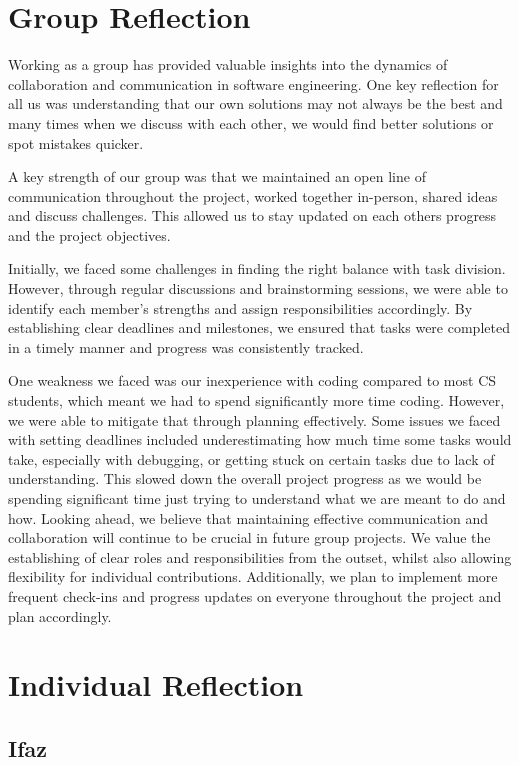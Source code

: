 \documentclass[12pt]{article}
\begin{document}
\section{Group Reflection}

Working as a group has provided valuable insights into the dynamics of collaboration and communication in software engineering. One key reflection for all us was understanding that our own solutions may not always be the best and many times when we discuss with each other, we would find better solutions or spot mistakes quicker.

A key strength of our group was that we maintained an open line of communication throughout the project, worked together in-person, shared ideas and  discuss challenges. This allowed us to stay updated on each others progress and the project objectives.

Initially, we faced some challenges in finding the right balance with task division. However, through regular discussions and brainstorming sessions, we were able to identify each member's strengths and assign responsibilities accordingly. By establishing clear deadlines and milestones, we ensured that tasks were completed in a timely manner and progress was consistently tracked.

One weakness we faced was our inexperience with coding compared to most CS students, which meant we had to spend significantly more time coding. However, we were able to mitigate that through planning effectively. Some issues we  faced with setting deadlines included underestimating how much time some tasks would take, especially with debugging, or getting stuck on certain tasks due to lack of understanding. This slowed down the overall project progress as we would be spending significant time just trying to understand what we are meant to do and how.
Looking ahead, we believe that maintaining effective communication and collaboration will continue to be crucial in future group projects. We  value the establishing of clear roles and responsibilities from the outset, whilst also allowing flexibility for individual contributions. Additionally, we plan to implement more frequent check-ins and progress updates on everyone throughout the project and plan accordingly.

\section{Individual Reflection}

\subsection{Ifaz}
\end{document}
